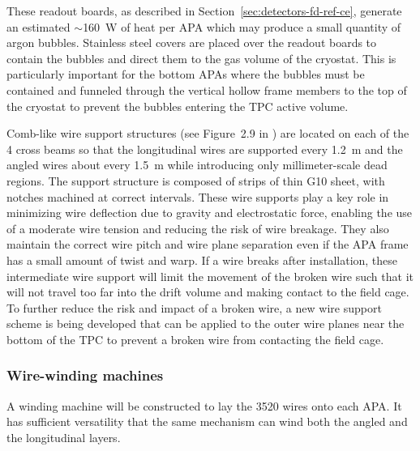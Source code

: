 These readout boards, as described in
Section~\ref{sec:detectors-fd-ref-ce}, generate an estimated
$\sim$160~W of heat per APA which may produce a small quantity of
argon bubbles.  Stainless steel covers are placed over the readout
boards to contain the bubbles and direct them to the gas volume of the
cryostat. This is particularly important for the bottom APAs where the
bubbles must be contained and funneled through the vertical hollow
frame members to the top of the cryostat to prevent the bubbles
entering the TPC active volume.

Comb-like wire support structures (see Figure~2.9 in \anxlbnefd) are
located on each of the 4 cross beams so that the longitudinal wires
are supported every 1.2~m and the angled wires about every 1.5~m while
introducing only millimeter-scale dead regions. The support structure
is composed of strips of thin G10 sheet, with notches machined at
correct intervals.  These wire supports play a key role in minimizing
wire deflection due to gravity and electrostatic force, enabling the
use of a moderate wire tension and reducing the risk of wire breakage.
They also maintain the correct wire pitch and wire plane separation
even if the APA frame has a small amount of twist and warp.  If a wire
breaks after installation, these intermediate wire support will limit
the movement of the broken wire such that it will not travel too far
into the drift volume and making contact to the field cage.  To
further reduce the risk and impact of a broken wire, a new wire
support scheme is being developed that can be applied to the outer
wire planes near the bottom of the TPC to prevent a broken wire from
contacting the field cage.


\subsubsection{Wire-winding machines}
\label{subsec:fd-ref-wirewinding}

A winding machine will be constructed to lay the 3520 wires onto each
APA. It has sufficient versatility that the same mechanism can wind
both the angled and the longitudinal layers.
 
